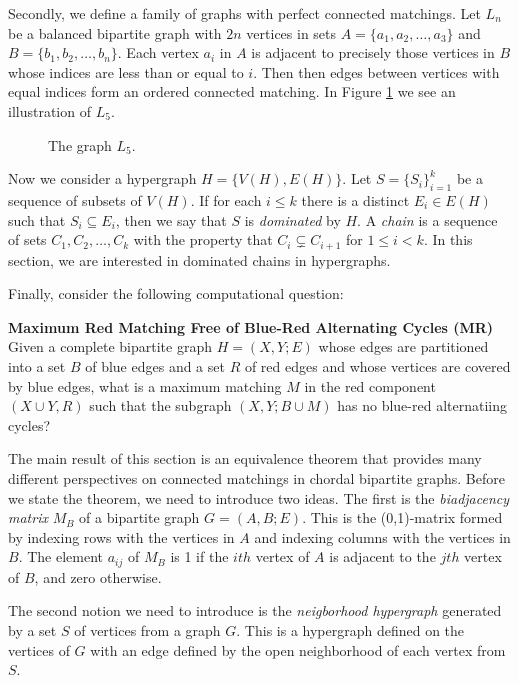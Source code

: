 Secondly, we define a family of graphs with perfect connected matchings.  Let $L_n$ be a balanced bipartite graph with $2n$ vertices in sets $A = \{a_1, a_2, \ldots, a_3\}$ and $B = \{b_1, b_2, \ldots, b_n\}$.  Each vertex $a_i$ in $A$ is adjacent to precisely those vertices in $B$ whose indices are less than or equal to $i$.  Then then edges between vertices with equal indices form an ordered connected matching.  In Figure \ref{l5} we see an illustration of $L_5$.
\begin{figure}
	\begin{center}
	
	\end{center}
	\caption{The graph $L_5$.}
	\label{l5}
\end{figure} 

Now we consider a hypergraph $H = \{V(H), E(H)\}$.  Let $S = \{S_i\}_{i=1}^k$ be a sequence of subsets of $V(H)$. If for each $i \leq k$ there is a distinct $E_i \in E(H)$ such that $S_i \subseteq E_i$, then we say that $S$ is {\it dominated} by $H$. 
A {\it chain} is a sequence of sets $C_1, C_2, \ldots, C_k$ with the property that $C_i \subsetneq C_{i+1}$ for $1 \leq i <k$.  In this section, we are interested in dominated chains in hypergraphs.

Finally, consider the following computational question:
\begin{framed}\noindent\textbf{Maximum Red Matching Free of Blue-Red Alternating Cycles (MR)}
	\vskip 0.5cm
	\noindent Given a complete bipartite graph $H = (X,Y; E)$ whose edges are partitioned into a set $B$ of blue edges and a set $R$ of red edges and whose vertices are covered by blue edges, what is a maximum matching $M$ in the red component $(X\cup Y, R)$ such that the subgraph $(X,Y; B \cup M)$ has no blue-red alternatiing cycles?
	
\end{framed}

The main result of this section is an equivalence theorem that provides many different perspectives on connected matchings in chordal bipartite graphs.   Before we state the theorem, we need to introduce two ideas.  The first is the {\it biadjacency matrix} $M_B$ of a bipartite graph $G = (A,B;E)$.  This is the (0,1)-matrix formed by indexing rows with the vertices in $A$ and indexing columns with the vertices in $B$.  The element $a_{ij}$ of $M_B$ is 1 if the $ith$ vertex of $A$ is adjacent to the $jth$ vertex of $B$, and zero otherwise.

The second notion we need to introduce is the {\it neigborhood hypergraph} generated by a set $S$ of vertices from a graph $G$.  This is a hypergraph defined on the vertices of $G$ with an edge defined by the open neighborhood of each vertex from $S$.


